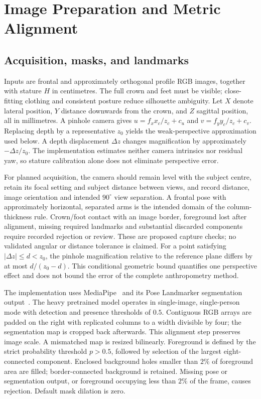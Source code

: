 \documentclass[11pt,a4paper]{article}
\begin{document}
\section{Image Preparation and Metric Alignment}
\subsection{Acquisition, masks, and landmarks}
Inputs are frontal and approximately orthogonal profile RGB images, together with stature $H$ in centimetres. The full crown and feet must be visible; close-fitting clothing and consistent posture reduce silhouette ambiguity. Let $X$ denote lateral position, $Y$ distance downwards from the crown, and $Z$ sagittal position, all in millimetres. A pinhole camera gives $u=f_xx_c/z_c+c_u$ and $v=f_yy_c/z_c+c_v$. Replacing depth by a representative $z_0$ yields the weak-perspective approximation used below. A depth displacement $\Delta z$ changes magnification by approximately $-\Delta z/z_0$. The implementation estimates neither camera intrinsics nor residual yaw, so stature calibration alone does not eliminate perspective error.

For planned acquisition, the camera should remain level with the subject centre, retain its focal setting and subject distance between views, and record distance, image orientation and intended $90^\circ$ view separation. A frontal pose with approximately horizontal, separated arms is the intended domain of the column-thickness rule. Crown/foot contact with an image border, foreground lost after alignment, missing required landmarks and substantial discarded components require recorded rejection or review. These are proposed capture checks; no validated angular or distance tolerance is claimed. For a point satisfying $|\Delta z|\leq d<z_0$, the pinhole magnification relative to the reference plane differs by at most $d/(z_0-d)$. This conditional geometric bound quantifies one perspective effect and does not bound the error of the complete anthropometry method.

The implementation uses MediaPipe~\cite{lugaresi2019mediapipe} and its Pose Landmarker segmentation output~\cite{mediapipeguide}. The heavy pretrained model operates in single-image, single-person mode with detection and presence thresholds of $0.5$. Contiguous RGB arrays are padded on the right with replicated columns to a width divisible by four; the segmentation map is cropped back afterwards. This alignment step preserves image scale. A mismatched map is resized bilinearly. Foreground is defined by the strict probability threshold $p>0.5$, followed by selection of the largest eight-connected component. Enclosed background holes smaller than $2\%$ of foreground area are filled; border-connected background is retained. Missing pose or segmentation output, or foreground occupying less than $2\%$ of the frame, causes rejection. Default mask dilation is zero.
\end{document}
